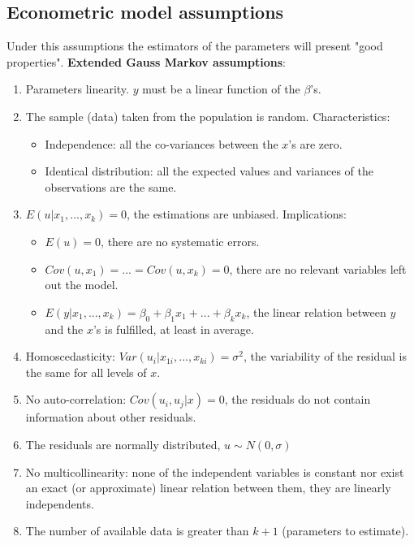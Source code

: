 \documentclass[10pt,landscape]{article}
\begin{document}
\begin{multicols}{3}
\subsection*{Econometric model assumptions}


Under this assumptions the estimators of the parameters will present "good properties". \textbf{Extended Gauss Markov assumptions}:

\begin{enumerate}[leftmargin=*]
\item Parameters linearity. $y$ must be a linear function of the $\beta$'s.
\item The sample (data) taken from the population is random. Characteristics:
\begin{itemize}[leftmargin=*]
\item Independence: all the co-variances between the $x$'s are zero.
\item Identical distribution: all the expected values and variances of the observations are the same.
\end{itemize}
\item $E(u | x_1, ..., x_k) = 0$, the estimations are unbiased. Implications:
\begin{itemize}[leftmargin=*]
\item $E(u) = 0$, there are no systematic errors.
\item $Cov(u, x_1) = ... = Cov(u, x_k) = 0$, there are no relevant variables left out the model.
\item $E(y | x_1, ..., x_k) = \beta_0 + \beta_1 x_1 + ... + \beta_k x_k$, the linear relation between $y$ and the $x$'s is fulfilled, at least in average.
\end{itemize}
\item Homoscedasticity: $Var(u_i | x_{1i},  ..., x_{ki}) = \sigma^2$, the variability of the residual is the same for all levels of $x$.
\item No auto-correlation: $Cov(u_i, u_j | x) = 0$, the residuals do not contain information about other residuals.
\item The residuals are normally distributed, $u \sim N(0, \sigma)$
\item No multicollinearity: none of the independent variables is constant nor exist an exact (or approximate) linear relation between them, they are linearly independents.
\item The number of available data is greater than $k+1$ (parameters to estimate).
\end{enumerate}


\end{multicols}
\end{document}
